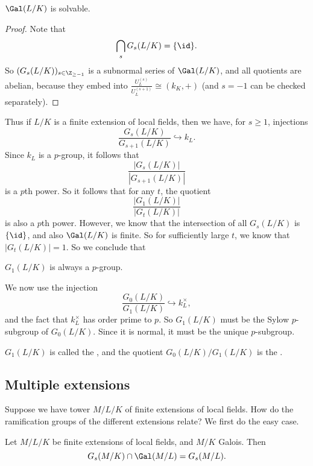 \documentclass[a4paper]{article}
\begin{document}
\begin{cor}
  $\Gal(L/K)$ is solvable.
\end{cor}

\begin{proof}
  Note that
  \[
    \bigcap_s G_s(L/K) = \{\id\}.
  \]
  So $(G_s(L/K))_{s \in \Z_{\geq -1}}$ is a subnormal series of $\Gal(L/K)$, and all quotients are abelian, because they embed into $\frac{U_L^{(s)}}{U_L^{(s + 1)}} \cong (k_K, +)$ (and $s = -1$ can be checked separately).
\end{proof}

Thus if $L/K$ is a finite extension of local fields, then we have, for $s \geq 1$, injections
\[
  \frac{G_s(L/K)}{G_{s + 1}(L/K)} \hookrightarrow k_L.
\]
Since $k_L$ is a $p$-group, it follows that
\[
  \frac{|G_s(L/K)|}{|G_{s + 1}(L/K)|}
\]
is a $p$th power. So it follows that for any $t$, the quotient
\[
  \frac{|G_1(L/K)|}{|G_t(L/K)|}
\]
is also a $p$th power. However, we know that the intersection of all $G_s(L/K)$ is $\{\id\}$, and also $\Gal(L/K)$ is finite. So for sufficiently large $t$, we know that $|G_t(L/K)| = 1$. So we conclude that
\begin{prop}
  $G_1(L/K)$ is always a $p$-group.
\end{prop}

We now use the injection
\[
  \frac{G_0(L/K)}{G_1(L/K)} \hookrightarrow k_L^\times,
\]
and the fact that $k_L^\times$ has order prime to $p$. So $G_1(L/K)$ must be the Sylow $p$-subgroup of $G_0(L/K)$. Since it is normal, it must be the unique $p$-subgroup.

\begin{defi}
  $G_1(L/K)$ is called the , and the quotient $G_0(L/K)/G_1(L/K)$ is the .
\end{defi}

\subsection{Multiple extensions}
Suppose we have tower $M/L/K$ of finite extensions of local fields. How do the ramification groups of the different extensions relate? We first do the easy case.

\begin{prop}
  Let $M/L/K$ be finite extensions of local fields, and $M/K$ Galois. Then
  \[
    G_s(M/K) \cap \Gal(M/L) = G_s(M/L).
  \]
\end{prop}
\end{document}
